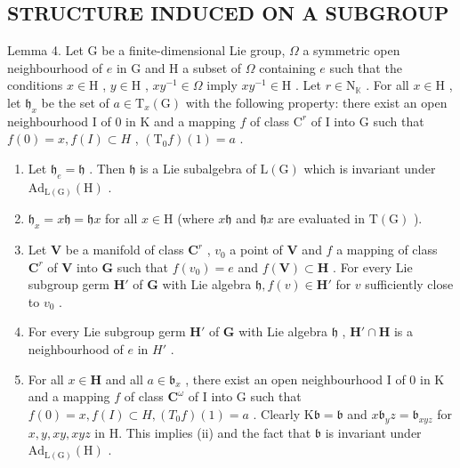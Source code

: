 \subsection{STRUCTURE INDUCED ON A SUBGROUP}

Lemma 4. Let G be a finite-dimensional Lie group, \(\Omega\) a symmetric open neighbourhood of \(e\) in G and H a subset of \(\Omega\) containing \(e\) such that the conditions \(x \in \mathrm{H}\) , \(y \in \mathrm{H}\) , \(xy^{-1} \in \Omega\) imply \(xy^{-1} \in \mathrm{H}\) . Let \(r \in \mathrm{N}_{\mathbb{K}}\) . For all \(x \in \mathrm{H}\) , let \(\mathfrak{h}_x\) be the set of \(a \in \mathrm{T}_x(\mathrm{G})\) with the following property: there exist an open neighbourhood I of 0 in K and a mapping \(f\) of class \(\mathrm{C}^r\) of I into G such that \(f(0) = x, f(I) \subset H\) , \((\mathrm{T}_0f)(1) = a\) .

\begin{enumerate}
\def\labelenumi{(\roman{enumi})}
\item
  Let \(\mathfrak{h}_e = \mathfrak{h}\) . Then \(\mathfrak{h}\) is a Lie subalgebra of \(\mathrm{L}(\mathrm{G})\) which is invariant under \(\mathrm{Ad}_{\mathrm{L}(\mathrm{G})}(\mathrm{H})\) .
\item
  \(\mathfrak{h}_x = x\mathfrak{h} = \mathfrak{h}x\) for all \(x\in \mathrm{H}\) (where \(x\mathfrak{h}\) and \(\mathfrak{h}x\) are evaluated in \(\mathrm{T(G)}\) ).
\item
  Let \(\mathbf{V}\) be a manifold of class \(\mathbf{C}^r\) , \(v_0\) a point of \(\mathbf{V}\) and \(f\) a mapping of class \(\mathbf{C}^r\) of \(\mathbf{V}\) into \(\mathbf{G}\) such that \(f(v_0) = e\) and \(f(\mathbf{V}) \subset \mathbf{H}\) . For every Lie subgroup germ \(\mathbf{H}'\) of \(\mathbf{G}\) with Lie algebra \(\mathfrak{h}, f(v) \in \mathbf{H}'\) for \(v\) sufficiently close to \(v_0\) .
\item
  For every Lie subgroup germ \(\mathbf{H}'\) of \(\mathbf{G}\) with Lie algebra \(\mathfrak{h}\) , \(\mathbf{H}' \cap \mathbf{H}\) is a neighbourhood of \(e\) in \(H'\) .
\item
  For all \(x \in \mathbf{H}\) and all \(a \in \mathfrak{b}_x\) , there exist an open neighbourhood I of 0 in K and a mapping \(f\) of class \(\mathbf{C}^{\omega}\) of I into G such that \(f(0) = x, f(I) \subset H, (T_0f)(1) = a\) . Clearly \(\mathrm{K}\mathfrak{b} = \mathfrak{b}\) and \(x\mathfrak{b}_y z = \mathfrak{b}_{xyz}\) for \(x, y, xy, xyz\) in H. This implies (ii) and the fact that \(\mathfrak{b}\) is invariant under \(\mathrm{Ad}_{\mathrm{L(G)}}(\mathrm{H})\) .
\end{enumerate}

